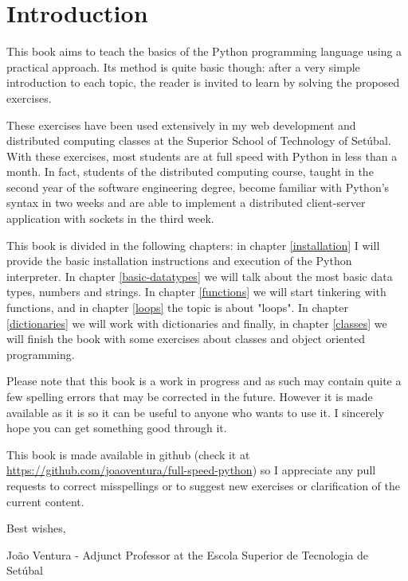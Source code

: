 \chapter{Introduction}\label{introduction}

This book aims to teach the basics of the Python programming language using a practical approach. Its method is quite basic though: after a very simple introduction to each topic, the reader is invited to learn by solving the proposed exercises.

These exercises have been used extensively in my web development and distributed computing classes at the Superior School of Technology of Setúbal. With these exercises, most students are at full speed with Python in less than a month. In fact, students of the distributed computing course, taught in the second year of the software engineering degree, become familiar with Python's syntax in two weeks and are able to implement a distributed client-server application with sockets in the third week.

This book is divided in the following chapters: in chapter \ref{installation} I will provide the basic installation instructions and execution of the Python interpreter. In chapter \ref{basic-datatypes} we will talk about the most basic data types, numbers and strings. In chapter \ref{functions} we will start tinkering with functions, and in chapter \ref{loops} the topic is about "loops". In chapter \ref{dictionaries} we will work with dictionaries and finally, in chapter \ref{classes} we will finish the book with some exercises about classes and object oriented programming.

Please note that this book is a work in progress and as such may contain quite a few spelling errors that may be corrected in the future. However it is made available as it is so it can be useful to anyone who wants to use it. I sincerely hope you can get something good through it.

This book is made available in github (check it at \url{https://github.com/joaoventura/full-speed-python}) so I appreciate any pull requests to correct misspellings or to suggest new exercises or clarification of the current content.

Best wishes,

João Ventura - Adjunct Professor at the Escola Superior de Tecnologia de Setúbal
